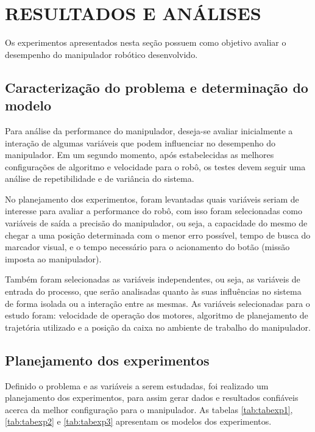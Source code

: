 \chapter{RESULTADOS E ANÁLISES}
\label{chap:result}

Os experimentos apresentados nesta seção possuem como objetivo avaliar o desempenho do manipulador robótico desenvolvido.

\section{Caracterização do problema e determinação do modelo}

Para análise da performance do manipulador, deseja-se avaliar inicialmente a interação de algumas variáveis que podem influenciar no desempenho do manipulador. Em um segundo momento, após estabelecidas as melhores configurações de algoritmo e velocidade para o robô, os testes devem seguir uma análise de repetibilidade e de variância do sistema.

No planejamento dos experimentos, foram levantadas quais variáveis seriam de interesse para avaliar a performance do robô, com isso foram selecionadas como variáveis de saída a precisão do manipulador, ou seja, a capacidade do mesmo de chegar a uma posição determinada com o menor erro possível, tempo de busca do marcador visual,  e o tempo necessário para o acionamento do botão (missão imposta ao manipulador). 

Também foram selecionadas as variáveis independentes, ou seja, as variáveis de entrada do processo, que serão analisadas quanto às suas influências no sistema de forma isolada ou a interação entre as mesmas. As variáveis selecionadas para o estudo foram: velocidade de operação dos motores, algoritmo de planejamento de trajetória utilizado e a posição da caixa no ambiente de trabalho do manipulador. 

\section{Planejamento dos experimentos}

Definido o problema e as variáveis a serem estudadas, foi realizado um planejamento dos experimentos, para assim gerar dados e resultados confiáveis acerca da melhor configuração para o manipulador. As tabelas \ref{tab:tabexp1}, \ref{tab:tabexp2} e \ref{tab:tabexp3} apresentam os modelos dos experimentos. 

